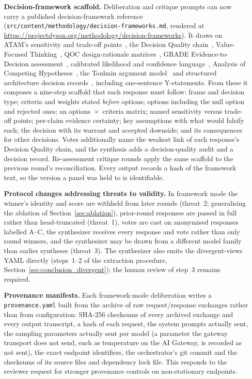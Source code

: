 \documentclass[11pt,a4paper]{article}
\begin{document}
\textbf{Decision-framework scaffold.} Deliberation and critique prompts can now carry a published decision-framework reference (\texttt{src/content/methodology/decision-frameworks.md}, rendered at \url{https://projectdyson.org/methodology/decision-frameworks}). It draws on ATAM's sensitivity and trade-off points~\cite{kazman2000atam}, the Decision Quality chain~\cite{spetzler2016decision}, Value-Focused Thinking~\cite{keeney1992value}, QOC design-rationale matrices~\cite{maclean1991qoc}, GRADE Evidence-to-Decision assessment~\cite{alonsocoello2016grade}, calibrated likelihood and confidence language~\cite{mastrandrea2010ipcc,odni2015icd203}, Analysis of Competing Hypotheses~\cite{heuer1999psychology}, the Toulmin argument model~\cite{toulmin1958uses} and structured architecture decision records~\cite{tyree2005decisions}, including one-sentence Y-statements. From these it composes a nine-step scaffold that each response must follow: frame and decision type; criteria and weights stated \emph{before} options; options including the null option and rejected ones; an options~$\times$~criteria matrix; named sensitivity versus trade-off points; per-claim evidence certainty; key assumptions with what would falsify each; the decision with its warrant and accepted downside; and its consequences for other decisions. Votes additionally name the weakest link of each response's Decision Quality chain, and the synthesis adds a decision-quality audit and a decision record. Re-assessment critique rounds apply the same scaffold to the previous round's reconciliation. Every output records a hash of the framework text, so the version a panel was held to is identifiable.

\textbf{Protocol changes addressing threats to validity.} In framework mode the winner's identity and score are withheld from later rounds (threat~2; generalising the ablation of Section~\ref{sec:ablation}), prior-round responses are passed in full rather than head-truncated (threat~1), votes are cast on anonymised responses labelled A--C, the synthesizer receives every response and vote rather than only round winners, and the synthesizer may be drawn from a different model family than earlier syntheses (threat~3). The synthesizer also emits the divergent-views YAML directly (steps~1--2 of the extraction procedure, Section~\ref{sec:conclusion_divergent}); the human review of step~3 remains required.

\textbf{Provenance manifests.} Each framework-mode deliberation writes a \texttt{provenance.yaml} built from the archive of raw request/response exchanges rather than from configuration: SHA-256 checksums of every archived exchange and every output transcript, a hash of each request, the system prompts actually sent, the sampling parameters actually sent per model (a parameter the gateway transport does not send, such as temperature on the AI Gateway, is recorded as not sent), the exact endpoint identifiers, the orchestrator's git commit and the checksums of its source files and dependency lock file. This responds to the reviewer request for stronger provenance controls on non-stationary endpoints.
\end{document}
